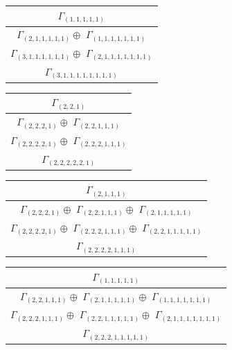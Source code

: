\documentclass[main.tex]{subfiles}
\begin{document}
\begin{minipage}{.4\textwidth}
\centering
\begin{tabular}{c}
$\Gamma_{(
1 , 
1 , 
1 , 
1 , 
1
)}$
\\ \hline
$\Gamma_{(
2 , 
1 , 
1 , 
1 , 
1 , 
1
)} \oplus$
$\Gamma_{(
1 , 
1 , 
1 , 
1 , 
1 , 
1 , 
1
)}$
\\ \hline
$\Gamma_{(
3 , 
1 , 
1 , 
1 , 
1 , 
1 , 
1
)} \oplus$
$\Gamma_{(
2 , 
1 , 
1 , 
1 , 
1 , 
1 , 
1 , 
1
)}$
\\ \hline
$\Gamma_{(
3 , 
1 , 
1 , 
1 , 
1 , 
1 , 
1 , 
1 , 
1
)}$
\\
\end{tabular}\end{minipage}
\bigskip
\begin{minipage}{.5\textwidth}
\centering
\begin{tabular}{c}
$\Gamma_{(
2 , 
2 , 
1
)}$
\\ \hline
$\Gamma_{(
2 , 
2 , 
2 , 
1
)} \oplus$
$\Gamma_{(
2 , 
2 , 
1 , 
1 , 
1
)}$
\\ \hline
$\Gamma_{(
2 , 
2 , 
2 , 
2 , 
1
)} \oplus$
$\Gamma_{(
2 , 
2 , 
2 , 
1 , 
1 , 
1
)}$
\\ \hline
$\Gamma_{(
2 , 
2 , 
2 , 
2 , 
2 , 
1
)}$
\\
\end{tabular}\end{minipage}
\begin{minipage}{.5\textwidth}
\centering
\begin{tabular}{c}
$\Gamma_{(
2 , 
1 , 
1 , 
1
)}$
\\ \hline
$\Gamma_{(
2 , 
2 , 
2 , 
1
)} \oplus$
$\Gamma_{(
2 , 
2 , 
1 , 
1 , 
1
)} \oplus$
$\Gamma_{(
2 , 
1 , 
1 , 
1 , 
1 , 
1
)}$
\\ \hline
$\Gamma_{(
2 , 
2 , 
2 , 
2 , 
1
)} \oplus$
$\Gamma_{(
2 , 
2 , 
2 , 
1 , 
1 , 
1
)} \oplus$
$\Gamma_{(
2 , 
2 , 
1 , 
1 , 
1 , 
1 , 
1
)}$
\\ \hline
$\Gamma_{(
2 , 
2 , 
2 , 
2 , 
1 , 
1 , 
1
)}$
\\
\end{tabular}\end{minipage}
\bigskip
\begin{minipage}{.5\textwidth}
\centering
\begin{tabular}{c}
$\Gamma_{(
1 , 
1 , 
1 , 
1 , 
1
)}$
\\ \hline
$\Gamma_{(
2 , 
2 , 
1 , 
1 , 
1
)} \oplus$
$\Gamma_{(
2 , 
1 , 
1 , 
1 , 
1 , 
1
)} \oplus$
$\Gamma_{(
1 , 
1 , 
1 , 
1 , 
1 , 
1 , 
1
)}$
\\ \hline
$\Gamma_{(
2 , 
2 , 
2 , 
1 , 
1 , 
1
)} \oplus$
$\Gamma_{(
2 , 
2 , 
1 , 
1 , 
1 , 
1 , 
1
)} \oplus$
$\Gamma_{(
2 , 
1 , 
1 , 
1 , 
1 , 
1 , 
1 , 
1
)}$
\\ \hline
$\Gamma_{(
2 , 
2 , 
2 , 
1 , 
1 , 
1 , 
1 , 
1
)}$
\\
\end{tabular}\end{minipage}
\end{document}
